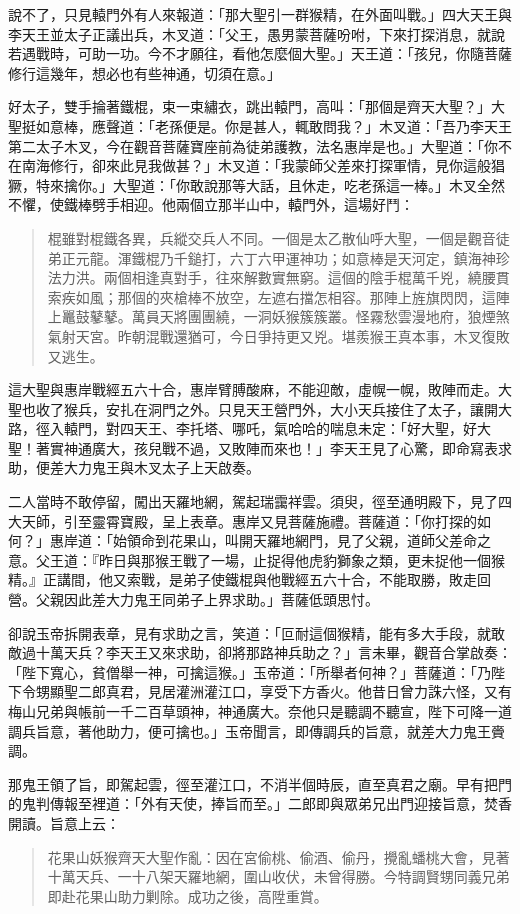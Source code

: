 說不了，只見轅門外有人來報道：「那大聖引一群猴精，在外面叫戰。」四大天王與李天王並太子正議出兵，木叉道：「父王，愚男蒙菩薩吩咐，下來打探消息，就說若遇戰時，可助一功。今不才願往，看他怎麼個大聖。」天王道：「孩兒，你隨菩薩修行這幾年，想必也有些神通，切須在意。」

好太子，雙手掄著鐵棍，束一束繡衣，跳出轅門，高叫：「那個是齊天大聖？」大聖挺如意棒，應聲道：「老孫便是。你是甚人，輒敢問我？」木叉道：「吾乃李天王第二太子木叉，今在觀音菩薩寶座前為徒弟護教，法名惠岸是也。」大聖道：「你不在南海修行，卻來此見我做甚？」木叉道：「我蒙師父差來打探軍情，見你這般猖獗，特來擒你。」大聖道：「你敢說那等大話，且休走，吃老孫這一棒。」木叉全然不懼，使鐵棒劈手相迎。他兩個立那半山中，轅門外，這場好鬥：
\begin{quote}
棍雖對棍鐵各異，兵縱交兵人不同。一個是太乙散仙呼大聖，一個是觀音徒弟正元龍。渾鐵棍乃千鎚打，六丁六甲運神功；如意棒是天河定，鎮海神珍法力洪。兩個相逢真對手，往來解數實無窮。這個的陰手棍萬千兇，繞腰貫索疾如風；那個的夾槍棒不放空，左遮右擋怎相容。那陣上旌旗閃閃，這陣上鼉鼓鼕鼕。萬員天將團團繞，一洞妖猴簇簇叢。怪霧愁雲漫地府，狼煙煞氣射天宮。昨朝混戰還猶可，今日爭持更又兇。堪羨猴王真本事，木叉復敗又逃生。
\end{quote}

這大聖與惠岸戰經五六十合，惠岸臂膊酸麻，不能迎敵，虛幌一幌，敗陣而走。大聖也收了猴兵，安扎在洞門之外。只見天王營門外，大小天兵接住了太子，讓開大路，徑入轅門，對四天王、李托塔、哪吒，氣哈哈的喘息未定：「好大聖，好大聖！著實神通廣大，孩兒戰不過，又敗陣而來也！」李天王見了心驚，即命寫表求助，便差大力鬼王與木叉太子上天啟奏。

二人當時不敢停留，闖出天羅地網，駕起瑞靄祥雲。須臾，徑至通明殿下，見了四大天師，引至靈霄寶殿，呈上表章。惠岸又見菩薩施禮。菩薩道：「你打探的如何？」惠岸道：「始領命到花果山，叫開天羅地網門，見了父親，道師父差命之意。父王道：『昨日與那猴王戰了一場，止捉得他虎豹獅象之類，更未捉他一個猴精。』正講間，他又索戰，是弟子使鐵棍與他戰經五六十合，不能取勝，敗走回營。父親因此差大力鬼王同弟子上界求助。」菩薩低頭思忖。

卻說玉帝拆開表章，見有求助之言，笑道：「叵耐這個猴精，能有多大手段，就敢敵過十萬天兵？李天王又來求助，卻將那路神兵助之？」言未畢，觀音合掌啟奏：「陛下寬心，貧僧舉一神，可擒這猴。」玉帝道：「所舉者何神？」菩薩道：「乃陛下令甥顯聖二郎真君，見居灌洲灌江口，享受下方香火。他昔日曾力誅六怪，又有梅山兄弟與帳前一千二百草頭神，神通廣大。奈他只是聽調不聽宣，陛下可降一道調兵旨意，著他助力，便可擒也。」玉帝聞言，即傳調兵的旨意，就差大力鬼王賫調。

那鬼王領了旨，即駕起雲，徑至灌江口，不消半個時辰，直至真君之廟。早有把門的鬼判傳報至裡道：「外有天使，捧旨而至。」二郎即與眾弟兄出門迎接旨意，焚香開讀。旨意上云：
\begin{quote}
花果山妖猴齊天大聖作亂：因在宮偷桃、偷酒、偷丹，攪亂蟠桃大會，見著十萬天兵、一十八架天羅地網，圍山收伏，未曾得勝。今特調賢甥同義兄弟即赴花果山助力剿除。成功之後，高陞重賞。
\end{quote}

